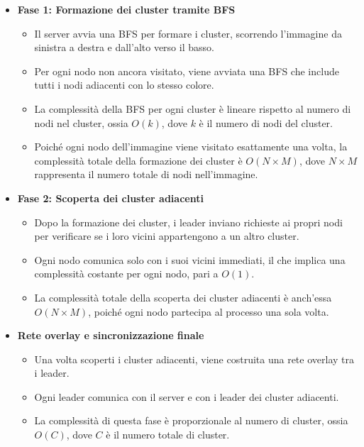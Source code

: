 \documentclass[12pt, a4paper]{report}
\begin{document}
\begin{itemize}
    \item \textbf{Fase 1: Formazione dei cluster tramite BFS}
    \begin{itemize}
        \item Il server avvia una BFS per formare i cluster, scorrendo l'immagine da sinistra a destra e dall'alto verso il basso.
        \item Per ogni nodo non ancora visitato, viene avviata una BFS che include tutti i nodi adiacenti con lo stesso colore.
        \item La complessit\`a della BFS per ogni cluster \`e lineare rispetto al numero di nodi nel cluster, ossia $O(k)$, dove $k$ \`e il numero di nodi del cluster.
        \item Poiché ogni nodo dell'immagine viene visitato esattamente una volta, la complessit\`a totale della formazione dei cluster \`e $O(N \times M)$, dove $N \times M$ rappresenta il numero totale di nodi nell'immagine.
    \end{itemize}

    \item \textbf{Fase 2: Scoperta dei cluster adiacenti}
    \begin{itemize}
        \item Dopo la formazione dei cluster, i leader inviano richieste ai propri nodi per verificare se i loro vicini appartengono a un altro cluster.
        \item Ogni nodo comunica solo con i suoi vicini immediati, il che implica una complessit\`a costante per ogni nodo, pari a $O(1)$.
        \item La complessit\`a totale della scoperta dei cluster adiacenti \`e anch'essa $O(N \times M)$, poiché ogni nodo partecipa al processo una sola volta.
    \end{itemize}
    \newpage
    \item \textbf{Rete overlay e sincronizzazione finale}
    \begin{itemize}
        \item Una volta scoperti i cluster adiacenti, viene costruita una rete overlay tra i leader.
        \item Ogni leader comunica con il server e con i leader dei cluster adiacenti.
        \item La complessit\`a di questa fase \`e proporzionale al numero di cluster, ossia $O(C)$, dove $C$ \`e il numero totale di cluster.
    \end{itemize}


\end{itemize}
\end{document}
